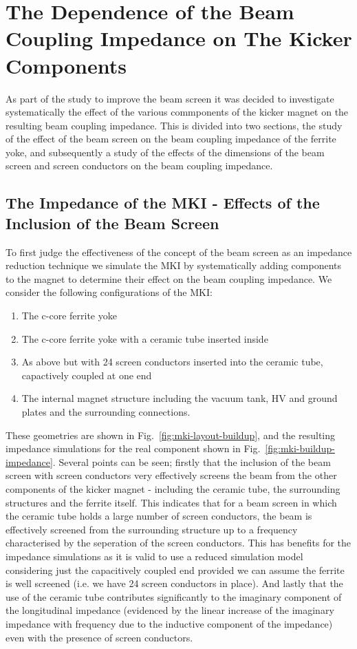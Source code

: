 \section{The Dependence of the Beam Coupling Impedance on The Kicker Components}

As part of the study to improve the beam screen it was decided to investigate systematically the effect of the various commponents of the kicker magnet on the resulting beam coupling impedance. This is divided into two sections, the study of the effect of the beam screen on the beam coupling impedance of the ferrite yoke, and subsequently a study of the effects of the dimensions of the beam screen and screen conductors on the beam coupling impedance.

\subsection{The Impedance of the MKI - Effects of the Inclusion of the Beam Screen}

To first judge the effectiveness of the concept of the beam screen as an impedance reduction technique we simulate the MKI by systematically adding components to the magnet to determine their effect on the beam coupling impedance. We consider the following configurations of the MKI:

\begin{enumerate}
\item{The c-core ferrite yoke}
\item{The c-core ferrite yoke with a ceramic tube inserted inside}
\item{As above but with 24 screen conductors inserted into the ceramic tube, capactively coupled at one end}
\item{The internal magnet structure including the vacuum tank, HV and ground plates and the surrounding connections.}
\end{enumerate}

These geometries are shown in Fig.~\ref{fig:mki-layout-buildup}, and the resulting impedance simulations for the real component shown in Fig.~\ref{fig:mki-buildup-impedance}. Several points can be seen; firstly that the inclusion of the beam screen with screen conductors very effectively screens the beam from the other components of the kicker magnet - including the ceramic tube, the surrounding structures and the ferrite itself. This indicates that for a beam screen in which the ceramic tube holds a large number of screen conductors, the beam is effectively screened from the surrounding structure up to a frequency characterised by the seperation of the screen conductors. This has benefits for the impedance simulations as it is valid to use a reduced simulation model considering just the capacitively coupled end provided we can assume the ferrite is well screened (i.e. we have 24 screen conductors in place). And lastly that the use of the ceramic tube contributes significantly to the imaginary component of the longitudinal impedance (evidenced by the linear increase of the imaginary impedance with frequency due to the inductive component of the impedance) even with the presence of screen conductors.
 
